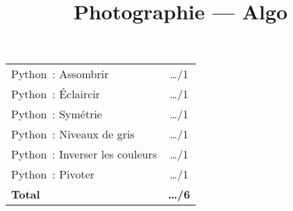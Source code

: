 \documentclass[12pt]{article}
\title{Photographie --- Algo}
\begin{document}

\begin{tabularx}{\textwidth}{Xc}
  \toprule
  Python : Assombrir & …/1 \\
  Python : Éclaircir & …/1 \\
  Python : Symétrie & …/1 \\
  Python : Niveaux de gris & …/1 \\
  Python : Inverser les couleurs & …/1 \\
  Python : Pivoter & …/1 \\
  \midrule
  \textbf{Total} & \textbf{…/6} \\

  \bottomrule
\end{tabularx}
\end{document}
